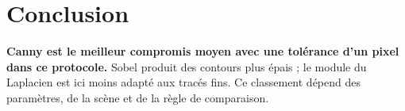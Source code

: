 \section{Conclusion}
\textbf{Canny est le meilleur compromis moyen avec une tolérance d'un pixel dans ce protocole.} Sobel produit des contours plus épais ; le module du Laplacien est ici moins adapté aux tracés fins. Ce classement dépend des paramètres, de la scène et de la règle de comparaison.

